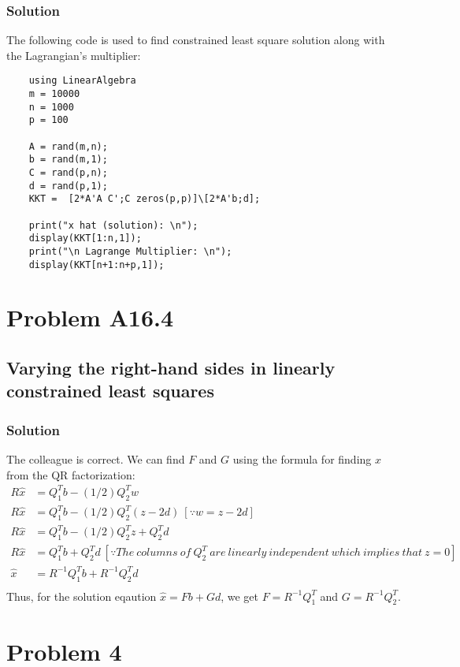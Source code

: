 \documentclass{article}
\begin{document}
\subsubsection*{Solution}
The following code is used to find constrained least square solution along with the Lagrangian's multiplier:
    \begin{verbatim}
    using LinearAlgebra
    m = 10000
    n = 1000
    p = 100
    
    A = rand(m,n);
    b = rand(m,1);
    C = rand(p,n);
    d = rand(p,1);
    KKT =  [2*A'A C';C zeros(p,p)]\[2*A'b;d];
    
    print("x hat (solution): \n");
    display(KKT[1:n,1]);
    print("\n Lagrange Multiplier: \n");
    display(KKT[n+1:n+p,1]);

    \end{verbatim}
\section*{Problem A16.4}
\subsection*{Varying the right-hand sides in linearly constrained least squares}
\subsubsection*{Solution}
The colleague is correct. We can find $F$ and $G$ using the formula for finding $\hat{x}$ from the QR factorization: 
\begin{align*}
    R\hat{x} & = Q^T_1 b - (1/2)Q^T_2 w\\
    R\hat{x} & = Q^T_1 b - (1/2)Q^T_2 (z-2d)\ [\because w = z-2d]\\
    R\hat{x} & = Q^T_1 b - (1/2)Q^T_2 z + Q^T_2d\\
    R\hat{x} & = Q^T_1 b + Q^T_2d\  [\because The\ columns\ of\ Q^T_2\ are\ linearly\ independent\ which\ implies\ that\ z = 0]\\
    \hat{x} & = R^{-1} Q^T_1 b + R^{-1}Q^T_2d\\
\end{align*}
Thus, for the solution eqaution $\hat{x} = Fb+Gd$, we get $F = R^{-1}Q^T_1$ and $G = R^{-1}Q^T_2$.
\section*{Problem 4}
\end{document}
